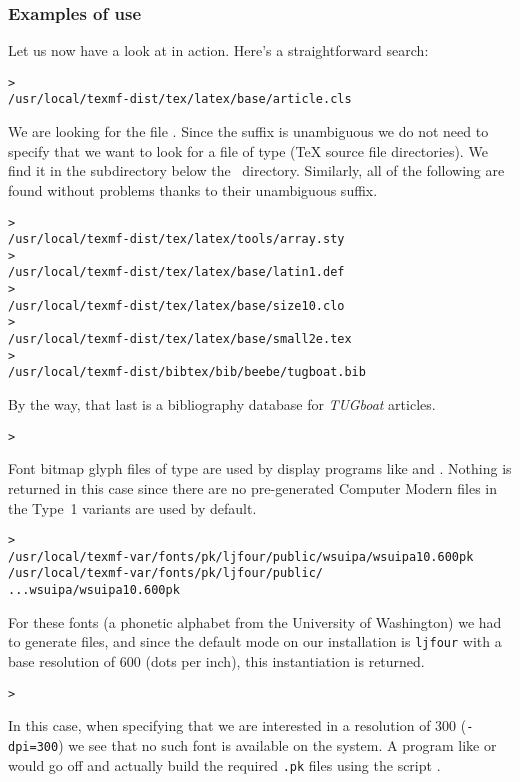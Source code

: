 \documentclass{article}
\begin{document}
\subsubsection{Examples of use}
\label{sec:examples-of-use}

Let us now have a look at \KPS{} in action.  Here's a straightforward search:

\begin{alltt}
> 
   /usr/local/texmf-dist/tex/latex/base/article.cls
\end{alltt}
We are looking for the file . Since the 
suffix is unambiguous we do not need to specify that we want to look for a
file of type  (\TeX{} source file directories). We find it in
the subdirectory  below the  \TL\
directory.  Similarly, all of the following are found without problems
thanks to their unambiguous suffix.
\begin{alltt}
> 
   /usr/local/texmf-dist/tex/latex/tools/array.sty
> 
   /usr/local/texmf-dist/tex/latex/base/latin1.def
> 
   /usr/local/texmf-dist/tex/latex/base/size10.clo
> 
   /usr/local/texmf-dist/tex/latex/base/small2e.tex
> 
   /usr/local/texmf-dist/bibtex/bib/beebe/tugboat.bib
\end{alltt}

By the way, that last is a \BibTeX{} bibliography database for
\textsl{TUGboat} articles.

\begin{alltt}
> 
\end{alltt}
Font bitmap glyph files of type  are used by display
programs like  and .  Nothing is returned in
this case since there are no pre-generated Computer Modern \samp{.pk}
files in \TL{}\Dash the Type~1 variants are used by default.
\begin{alltt}
> 
\ifSingleColumn   /usr/local/texmf-var/fonts/pk/ljfour/public/wsuipa/wsuipa10.600pk
\else /usr/local/texmf-var/fonts/pk/ljfour/public/
...                         wsuipa/wsuipa10.600pk
\fi\end{alltt}
For these fonts (a phonetic alphabet from the University of Washington)
we had to generate \samp{.pk} files, and since the default \MF{} mode on
our installation is \texttt{ljfour} with a base resolution of 600\dpi{}
(dots per inch), this instantiation is returned.
\begin{alltt}
> 
\end{alltt}
In this case, when specifying that we are interested in a resolution
of 300\dpi{} (\texttt{-dpi=300}) we see that no such font is available on
the system. A program like \cmdname{dvips} or \cmdname{xdvi} would
go off and actually build the required \texttt{.pk} files
using the script .
\end{document}
